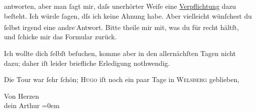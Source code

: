                antworten, aber man{ }ſagt mir, daſs unerhörter Weiſe eine \uline{Verpflichtung} dazu beſteht. Ich würde{ }ſagen, dſs ich keine Ahnung habe. Aber
               vielleicht wünſchest du{ }ſelbst irgend eine andre\substVorne{}\textsuperscript{.}\substDazwischen{}{ }Antwort.\substHinten{} Bitte theile mir mit, was {\pb}du für recht  hältſt,
               und{ }ſchicke mir das Formular zurück.\pend
           
\pstart
           Ich wollte dich{ }ſelbſt beſuchen, komme aber in den allernächſten Tagen nicht dazu;
               daher iſt leider briefliche Erledigung nothwendig.\pend
           
\pstart
           Die Tour war{ }ſehr{ }ſchön; \textsc{Hugo} iſt noch ein paar Tage in \textsc{Welsberg} geblieben,\pend
           
\pstart
           Von Herzen{\\[\baselineskip]}dein \spacefill\mbox{Arthur}\pend
           \leftskip=0em{}\endnumbering{}  \newcommand{\dateiname}{L01229}\newcommand{\titel}{Arthur Schnitzler an Hermann Bahr, [9. 7. 1902]}\newcommand{\editorInnen}{Herausgegeben von Martin Anton Müller}
